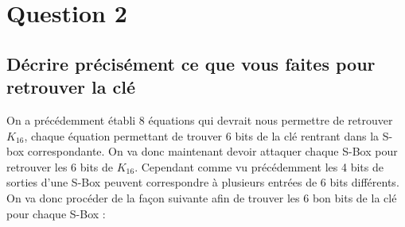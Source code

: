 \documentclass[a4paper,11pt]{article}
\begin{document}
	\section{Question 2} 
	\subsection{Décrire précisément ce que vous faites pour retrouver la clé}
	On a précédemment établi 8 équations qui devrait nous permettre de retrouver $K_{16}$, chaque équation permettant de trouver 6 bits de la clé rentrant dans la S-box correspondante.
	On va donc maintenant devoir attaquer chaque S-Box pour retrouver les 6 bits de $K_{16}$. Cependant comme vu précédemment les 4 bits de sorties d'une S-Box peuvent correspondre à plusieurs entrées de 6 bits différents. On va donc procéder de la façon suivante afin de trouver les 6 bon bits de la clé pour chaque S-Box : \\
\end{document}
